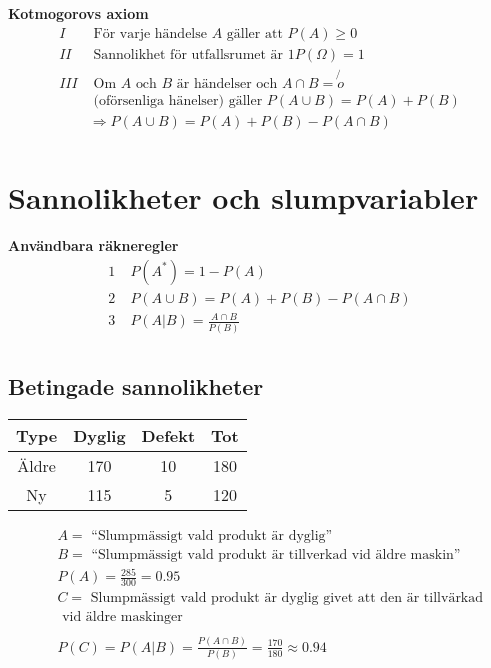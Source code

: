 \textbf{Kotmogorovs axiom}
\begin{align*}
  I &\text{ För varje händelse $A$ gäller att } P(A) \geq 0 \\
  II &\text{ Sannolikhet för utfallsrumet är } 1 P(\Omega)=1 \\
  III &\text{ Om $A$ och $B$ är händelser och } A\cap{B}=\not{o} \\
  &\text{ (oförsenliga hänelser) gäller } P(A\cup{B}) = P(A) + P(B) \\
  &\Rightarrow P(A\cup{B})=P(A)+P(B)-P(A\cap{B}) \\
\end{align*}

\newpage

\section{Sannolikheter och slumpvariabler}
\textbf{Användbara räkneregler}
\begin{align*}
  1 \; &P(A^*) = 1-P(A) \\
  2 \; &P(A\cup{B}) = P(A)+P(B)-P(A\cap{B}) \\
  3 \; &P(A|B) = \frac{A\cap{B}}{P(B)} \\
\end{align*}

\subsection{Betingade sannolikheter}
\begin{center}
\begin{tabular}{|c|c|c|c|}
 \hline
 Type & Dyglig & Defekt & Tot \\
 \hline
 Äldre & 170 & 10 & 180 \\
 \hline
 Ny & 115 & 5 & 120 \\
 \hline
\end{tabular}
\end{center}
\begin{align*}
  &\quad A = \text{ ``Slumpmässigt vald produkt är dyglig'' } \\
  &\quad B = \text{ ``Slumpmässigt vald produkt är tillverkad vid äldre maskin'' } \\
  &\quad P(A) = \frac{285}{300} = 0.95 \\
  &\quad C = \text{ Slumpmässigt vald produkt är dyglig givet att den är tillvärkad } \\
  &\quad \text{ vid äldre maskinger } \\
  &\quad \\
  &\quad P(C) = P(A|B) = \frac{P(A\cap{B})}{P(B)} = \frac{170}{180} \approx 0.94 \\
\end{align*}

